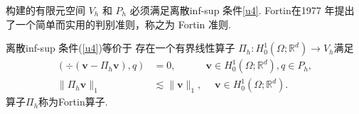 构建的有限元空间 $ V_h$ 和 $P_h$ 必须满足离散inf-sup 条件\eqref{u4}. Fortin\cite{Fortin1977}在1977 年提出了一个简单而实用的判别准则，称之为 Fortin 准则.
\begin{lemma}[Fortin 准则]\label{lem01}
离散inf-sup 条件(\ref{u4})等价于
存在一个有界线性算子 $\Pi_h :H_0^{1}(\Omega; \mathbb{R}^{d})\rightarrow V_h$满足
\begin{align}
 (\div(\boldsymbol{v}-\Pi_h\boldsymbol{v}), q) &=0,\qquad\quad  \boldsymbol{v}\in H_0^{1}(\Omega; \mathbb{R}^{d}),q\in P_{h} ,\label{k1}\\
 \|\Pi_h \boldsymbol{v}\|_{1} &\lesssim\|\boldsymbol{v}\|_{1}, \quad\;  \boldsymbol{v}\in H_0^{1}(\Omega; \mathbb{R}^{d}).\label{k2}
\end{align}
算子$\Pi_h$称为Fortin算子.
\end{lemma}
